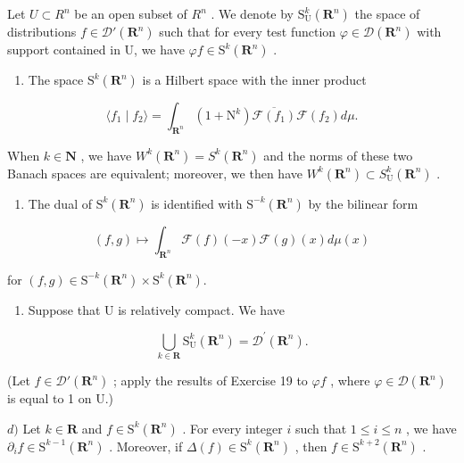 Let \(U \subset R^{n}\) be an open subset of \(R^{n}\) . We denote by \(\mathrm{S}_{\mathrm{U}}^{k}(\mathbf{R}^{n})\) the space of distributions \(f \in \mathcal{D}'(\mathbf{R}^{n})\) such that for every test function \(\varphi \in \mathcal{D}(\mathbf{R}^{n})\) with support contained in U, we have \(\varphi f \in \mathrm{S}^{k}(\mathbf{R}^{n})\) .

\begin{enumerate}
\def\labelenumi{\alph{enumi})}
\tightlist
\item
  The space \(\mathrm{S}^{k}(\mathbf{R}^{n})\) is a Hilbert space with the inner product
\end{enumerate}

\[
\langle f _ {1} \mid f _ {2} \rangle = \int_ {\mathbf {R} ^ {n}} (1 + \mathrm{N} ^ {k}) \overline {{\mathcal {F} (f _ {1})}} \mathcal {F} (f _ {2}) d \mu .
\]

When \(k \in \mathbf{N}\) , we have \(W^{k}(\mathbf{R}^{n}) = S^{k}(\mathbf{R}^{n})\) and the norms of these two Banach spaces are equivalent; moreover, we then have \(W^{k}(\mathbf{R}^{n}) \subset S_{\mathrm{U}}^{k}(\mathbf{R}^{n})\) .

\begin{enumerate}
\def\labelenumi{\alph{enumi})}
\setcounter{enumi}{1}
\tightlist
\item
  The dual of \(\mathrm{S}^{k}(\mathbf{R}^{n})\) is identified with \(\mathrm{S}^{-k}(\mathbf{R}^{n})\) by the bilinear form
\end{enumerate}

\[
(f, g) \mapsto \int_ {\mathbf {R} ^ {n}} \mathcal {F} (f) (- x) \mathcal {F} (g) (x) d \mu (x)
\]

for \((f,g)\in \mathrm{S}^{-k}(\mathbf{R}^n)\times \mathrm{S}^k (\mathbf{R}^n).\)

\begin{enumerate}
\def\labelenumi{\alph{enumi})}
\setcounter{enumi}{2}
\tightlist
\item
  Suppose that U is relatively compact. We have
\end{enumerate}

\[
\bigcup_ {k \in \mathbf {R}} \mathrm{S} _ {\mathrm{U}} ^ {k} (\mathbf {R} ^ {n}) = \mathcal {D} ^ {\prime} (\mathbf {R} ^ {n}).
\]

(Let \(f \in \mathcal{D}'(\mathbf{R}^n)\) ; apply the results of Exercise 19 to \(\varphi f\) , where \(\varphi \in \mathcal{D}(\mathbf{R}^n)\) is equal to 1 on U.)

\(d)\) Let \(k \in \mathbf{R}\) and \(f \in \mathrm{S}^k(\mathbf{R}^n)\) . For every integer \(i\) such that \(1 \leqslant i \leqslant n\) , we have \(\partial_i f \in \mathrm{S}^{k-1}(\mathbf{R}^n)\) . Moreover, if \(\Delta(f) \in \mathrm{S}^k(\mathbf{R}^n)\) , then \(f \in \mathrm{S}^{k+2}(\mathbf{R}^n)\) .

